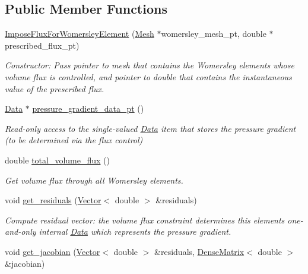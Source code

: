\subsection*{Public Member Functions}
\begin{DoxyCompactItemize}
\item 
\hyperlink{classoomph_1_1ImposeFluxForWomersleyElement_ac7fc5594b9f38a3587f0cd798ff3dfb2}{Impose\+Flux\+For\+Womersley\+Element} (\hyperlink{classoomph_1_1Mesh}{Mesh} $\ast$womersley\+\_\+mesh\+\_\+pt, double $\ast$prescribed\+\_\+flux\+\_\+pt)
\begin{DoxyCompactList}\small\item\em Constructor\+: Pass pointer to mesh that contains the Womersley elements whose volume flux is controlled, and pointer to double that contains the instantaneous value of the prescribed flux. \end{DoxyCompactList}\item 
\hyperlink{classoomph_1_1Data}{Data} $\ast$ \hyperlink{classoomph_1_1ImposeFluxForWomersleyElement_a77a13b7dad46eaf222164be9a62b0269}{pressure\+\_\+gradient\+\_\+data\+\_\+pt} ()
\begin{DoxyCompactList}\small\item\em Read-\/only access to the single-\/valued \hyperlink{classoomph_1_1Data}{Data} item that stores the pressure gradient (to be determined via the flux control) \end{DoxyCompactList}\item 
double \hyperlink{classoomph_1_1ImposeFluxForWomersleyElement_a9e3ca0a6477d9d4bb89d726f4e0f07b1}{total\+\_\+volume\+\_\+flux} ()
\begin{DoxyCompactList}\small\item\em Get volume flux through all Womersley elements. \end{DoxyCompactList}\item 
void \hyperlink{classoomph_1_1ImposeFluxForWomersleyElement_a6109bae3e5eb55b567e7ea85fca10884}{get\+\_\+residuals} (\hyperlink{classoomph_1_1Vector}{Vector}$<$ double $>$ \&residuals)
\begin{DoxyCompactList}\small\item\em Compute residual vector\+: the volume flux constraint determines this element\textquotesingle{}s one-\/and-\/only internal \hyperlink{classoomph_1_1Data}{Data} which represents the pressure gradient. \end{DoxyCompactList}\item 
void \hyperlink{classoomph_1_1ImposeFluxForWomersleyElement_a7c5c2bbd9577949c1fa78395930fd764}{get\+\_\+jacobian} (\hyperlink{classoomph_1_1Vector}{Vector}$<$ double $>$ \&residuals, \hyperlink{classoomph_1_1DenseMatrix}{Dense\+Matrix}$<$ double $>$ \&jacobian)

\end{DoxyCompactItemize}
